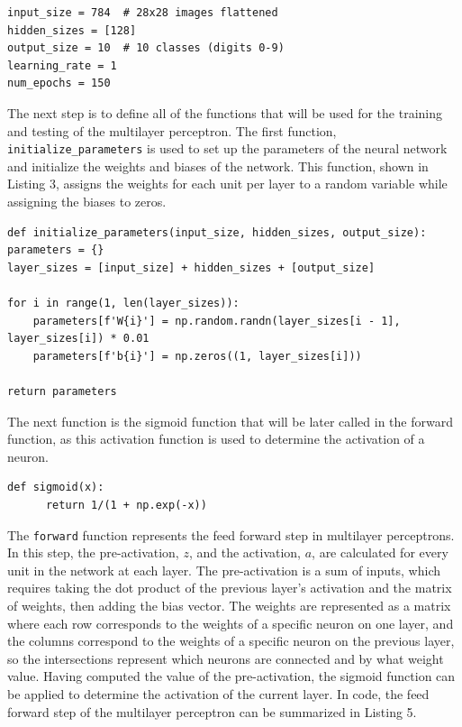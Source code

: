 \documentclass[twocolumn]{article}
\begin{document}
\begin{lstlisting}[caption={Global variable initialization when using the sigmoid activation function},captionpos=b]
input_size = 784  # 28x28 images flattened
hidden_sizes = [128]
output_size = 10  # 10 classes (digits 0-9)
learning_rate = 1
num_epochs = 150
\end{lstlisting}
The next step is to define all of the functions that will be used for the training and testing of the multilayer perceptron. The first function, \texttt{initialize\_parameters} is used to set up the parameters of the neural network and initialize the weights and biases of the network. This function, shown in Listing 3, assigns the weights for each unit per layer to a random variable while assigning the biases to zeros.
\begin{lstlisting}[caption={Determining the initial values of all weights and biases in the neural network},captionpos=b]
def initialize_parameters(input_size, hidden_sizes, output_size):
parameters = {}
layer_sizes = [input_size] + hidden_sizes + [output_size]

for i in range(1, len(layer_sizes)):
    parameters[f'W{i}'] = np.random.randn(layer_sizes[i - 1], layer_sizes[i]) * 0.01
    parameters[f'b{i}'] = np.zeros((1, layer_sizes[i]))

return parameters
\end{lstlisting}
The next function is the sigmoid function that will be later called in the forward function, as this activation function is used to determine the activation of a neuron.
\begin{lstlisting}[caption={The sigmoid function.},captionpos=b]
    def sigmoid(x):
      return 1/(1 + np.exp(-x))
\end{lstlisting}
The \texttt{forward} function represents the feed forward step in multilayer perceptrons. In this step, the pre-activation, $z$, and the activation, $a$, are calculated for every unit in the network at each layer. The pre-activation is a sum of inputs, which requires taking the dot product of the previous layer's activation and the matrix of weights, then adding the bias vector. The weights are represented as a matrix where each row corresponds to the weights of a specific neuron on one layer, and the columns correspond to the weights of a specific neuron on the previous layer, so the intersections represent which neurons are connected and by what weight value. Having computed the value of the pre-activation, the sigmoid function can be applied to determine the activation of the current layer. In code, the feed forward step of the multilayer perceptron can be summarized in Listing 5. 
\end{document}

